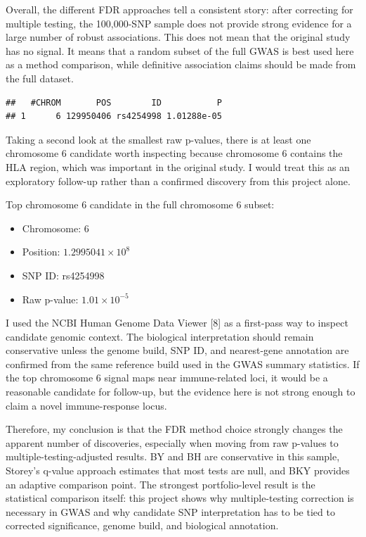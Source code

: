 \documentclass[
  12pt,
]{article}
\providecommand{\tightlist}{%
  \setlength{\itemsep}{0pt}\setlength{\parskip}{0pt}}
\begin{document}
Overall, the different FDR approaches tell a consistent story: after
correcting for multiple testing, the 100,000-SNP sample does not provide
strong evidence for a large number of robust associations. This does not
mean that the original study has no signal. It means that a random
subset of the full GWAS is best used here as a method comparison, while
definitive association claims should be made from the full dataset.

\begin{verbatim}
##   #CHROM       POS        ID           P
## 1      6 129950406 rs4254998 1.01288e-05
\end{verbatim}

Taking a second look at the smallest raw p-values, there is at least one
chromosome 6 candidate worth inspecting because chromosome 6 contains
the HLA region, which was important in the original study. I would treat
this as an exploratory follow-up rather than a confirmed discovery from
this project alone.

Top chromosome 6 candidate in the full chromosome 6 subset:

\begin{itemize}
\tightlist
\item
  Chromosome: 6
\item
  Position: \ensuremath{1.2995041\times 10^{8}}
\item
  SNP ID: rs4254998
\item
  Raw p-value: \ensuremath{1.01\times 10^{-5}}
\end{itemize}

I used the NCBI Human Genome Data Viewer {[}8{]} as a first-pass way to
inspect candidate genomic context. The biological interpretation should
remain conservative unless the genome build, SNP ID, and nearest-gene
annotation are confirmed from the same reference build used in the GWAS
summary statistics. If the top chromosome 6 signal maps near
immune-related loci, it would be a reasonable candidate for follow-up,
but the evidence here is not strong enough to claim a novel
immune-response locus.

Therefore, my conclusion is that the FDR method choice strongly changes
the apparent number of discoveries, especially when moving from raw
p-values to multiple-testing-adjusted results. BY and BH are
conservative in this sample, Storey's q-value approach estimates that
most tests are null, and BKY provides an adaptive comparison point. The
strongest portfolio-level result is the statistical comparison itself:
this project shows why multiple-testing correction is necessary in GWAS
and why candidate SNP interpretation has to be tied to corrected
significance, genome build, and biological annotation.
\end{document}
